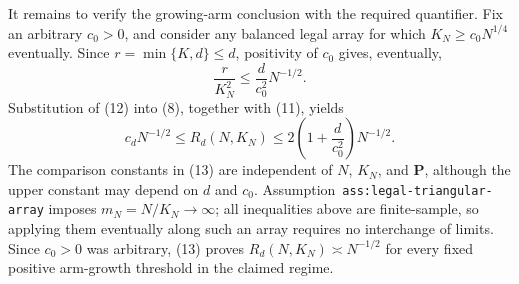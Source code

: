 It remains to verify the growing-arm conclusion with the required quantifier.  Fix an arbitrary \(c_0>0\), and consider any balanced legal array for which \(K_N\geq c_0N^{1/4}\) eventually.  Since \(r=\min\{K,d\}\leq d\), positivity of \(c_0\) gives, eventually,
\[
\frac r{K_N^2}\leq\frac d{c_0^2}N^{-1/2}.
\tag{12}
\]
Substitution of (12) into (8), together with (11), yields
\[
c_dN^{-1/2}
\leq R_d(N,K_N)
\leq 2\left(1+\frac d{c_0^2}\right)N^{-1/2}.
\tag{13}
\]
The comparison constants in (13) are independent of \(N\), \(K_N\), and \(\mathbf P\), although the upper constant may depend on \(d\) and \(c_0\).  Assumption~\texttt{ass:legal-triangular-array} imposes \(m_N=N/K_N\to\infty\); all inequalities above are finite-sample, so applying them eventually along such an array requires no interchange of limits.  Since \(c_0>0\) was arbitrary, (13) proves \(R_d(N,K_N)\asymp N^{-1/2}\) for every fixed positive arm-growth threshold in the claimed regime.
